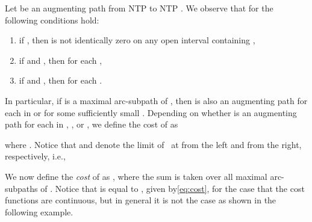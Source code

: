 \documentclass{svjour3}                     \smartqed
\begin{document}
Let  be an augmenting path from NTP  to NTP . We observe that for  the following conditions hold:
\begin{enumerate}[label = (\roman*)]
\item\label{it:AugPath1} if , then  is not identically zero on any open interval containing ,
\item\label{it:AugPath3} if  and , then  for each ,
\item\label{it:AugPath4} if  and , then  for each .
\end{enumerate}
In particular, if  is a maximal arc-subpath of , then  is also an augmenting path for each  in  or  for some sufficiently small . Depending on whether   is an augmenting path for each  in , , or , we define the cost  of  as

where . Notice that  and  denote the limit of~ at  from the left and from the right, respectively, i.e.,


We now define the \emph{cost}  of  as ,
where the sum is taken over all maximal arc-subpaths  of .
Notice that  is equal to , given by\eqref{eq:cost}, for the case that the cost functions are continuous, but in general it is not the case as shown in the following example.
\end{document}
